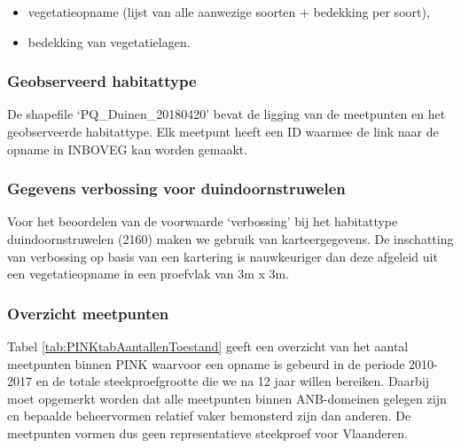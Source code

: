 \documentclass[twoside]{extreport}
\begin{document}
\begin{itemize}
\tightlist
\item
  vegetatieopname (lijst van alle aanwezige soorten + bedekking per
  soort),
\item
  bedekking van vegetatielagen.
\end{itemize}

\subsubsection{Geobserveerd habitattype}\label{geobserveerd-habitattype}

De shapefile `PQ\_Duinen\_20180420' bevat de ligging van de meetpunten
en het geobserveerde habitattype. Elk meetpunt heeft een ID waarmee de
link naar de opname in INBOVEG kan worden gemaakt.

\subsubsection{Gegevens verbossing voor
duindoornstruwelen}\label{gegevens-verbossing-voor-duindoornstruwelen}

Voor het beoordelen van de voorwaarde `verbossing' bij het habitattype
duindoornstruwelen (2160) maken we gebruik van karteergegevens. De
inschatting van verbossing op basis van een kartering is nauwkeuriger
dan deze afgeleid uit een vegetatieopname in een proefvlak van 3m x 3m.

\subsubsection{Overzicht meetpunten}\label{overzicht-meetpunten-4}

Tabel \ref{tab:PINKtabAantallenToestand} geeft een overzicht van het
aantal meetpunten binnen PINK waarvoor een opname is gebeurd in de
periode 2010-2017 en de totale steekproefgrootte die we na 12 jaar
willen bereiken. Daarbij moet opgemerkt worden dat alle meetpunten
binnen ANB-domeinen gelegen zijn en bepaalde beheervormen relatief vaker
bemonsterd zijn dan anderen. De meetpunten vormen dus geen
representatieve steekproef voor Vlaanderen.
\end{document}
